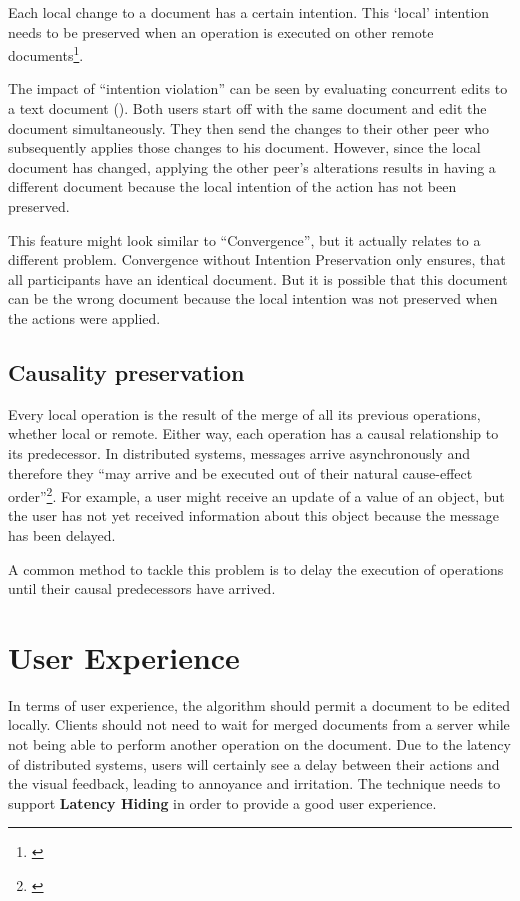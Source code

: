 Each local change to a document has a certain intention. This `local' intention needs to be preserved when an operation is executed on other remote documents\footnote{\cite[p. 66]{sun1998achieving}}.

The impact of ``intention violation'' can be seen by evaluating concurrent edits to a text document (). Both users start off with the same document and edit the document simultaneously. They then send the changes to their other peer who subsequently applies those changes to his document. However, since the local document has changed, applying the other peer's alterations results in having a different document because the local intention of the action has not been preserved.

This feature might look similar to ``Convergence'', but it actually relates to a different problem. Convergence without Intention Preservation only ensures, that all participants have an identical document. But it is possible that this document can be the wrong document because the local intention was not preserved when the actions were applied.

\subsection{Causality preservation}

Every local operation is the result of the merge of all its previous operations, whether local or remote. Either way, each operation has a causal relationship to its predecessor. In distributed systems, messages arrive asynchronously and therefore they ``may arrive and be executed out of their natural cause-effect order''\footnote{\cite[p. 65]{sun1998achieving}}. For example, a user might receive an update of a value of an object, but the user has not yet received information about this object because the message has been delayed.

A common method to tackle this problem is to delay the execution of operations until their causal predecessors have arrived. \cite[p. 2ff]{fidge1988timestamps}

\section{User Experience}
\label{sync-ux}

In terms of user experience, the algorithm should permit a document to be edited locally. Clients should not need to wait for merged documents from a server while not being able to perform another operation on the document. Due to the latency of distributed systems, users will certainly see a delay between their actions and the visual feedback, leading to annoyance and irritation. The technique needs to support \textbf{Latency Hiding} in order to provide a good user experience.

